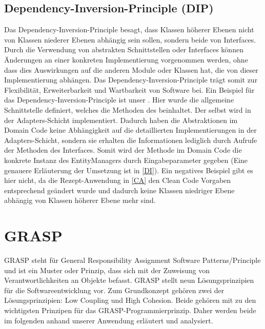\subsection{Dependency-Inversion-Principle (DIP)}
Das Dependency-Inversion-Principle besagt, dass Klassen höherer Ebenen nicht von Klassen niederer Ebenen abhängig sein sollen, sondern beide von Interfaces. Durch die Verwendung von abstrakten Schnittstellen oder Interfaces können Änderungen an einer konkreten Implementierung vorgenommen werden, ohne dass dies Auswirkungen auf die anderen Module oder Klassen hat, die von dieser Implementierung abhängen. Das Dependency-Inversion-Principle trägt somit zur Flexibilität, Erweiterbarkeit und Wartbarkeit von Software bei.
Ein Beispiel für das Dependency-Inversion-Principle ist unser . Hier wurde die allgemeine Schnittstelle  definiert, welches die Methoden des  beinhaltet. Der  selbst wird in der Adapters-Schicht implementiert. Dadurch haben die Abstraktionen im Domain Code keine Abhängigkeit auf die detaillierten Implementierungen in der Adapters-Schicht, sondern sie erhalten die Informationen lediglich durch Aufrufe der Methoden des Interfaces. Somit wird der Methode im Domain Code die konkrete Instanz des EntityManagers durch Eingabeparameter gegeben (Eine genauere Erläuterung der Umsetzung ist in \autoref{DI}). Ein negatives Beispiel gibt es hier nicht, da die Rezept-Anwendung in \autoref{CA} den Clean Code Vorgaben entsprechend geändert wurde und dadurch keine Klassen niedriger Ebene abhängig von Klassen höherer Ebene mehr sind.

\section{GRASP}
GRASP steht für General Responsibility Assignment Software Patterns/Principle und ist ein Muster oder Prinzip, dass sich mit der Zuweisung von Verantwortlichkeiten an Objekte befasst. GRASP stellt neun Lösungsprinzipien für die Softwareentwicklung vor. Zum Grundkonzept gehören zwei der Lösungsprinzipien: Low Coupling und High Cohesion. Beide gehören mit zu den wichtigsten Prinzipen für das GRASP-Programmierprinzip. Daher werden beide im folgenden anhand unserer Anwendung erläutert und analysiert.

